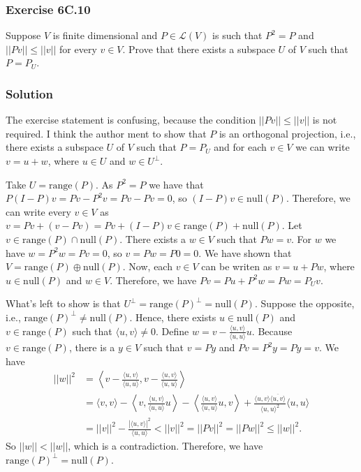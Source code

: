 \subsubsection*{Exercise 6C.10}

Suppose $V$ is finite dimensional and $P \in \mathcal{L}(V)$ is such that $P^2 = P$ and $||Pv|| \leq ||v||$ for every $v \in V$.
Prove that there exists a subspace $U$ of $V$ such that $P = P_U$.

\subsubsection*{Solution}

The exercise statement is confusing, because the condition $||Pv|| \leq ||v||$ is not required.
I think the author ment to show that $P$ is an orthogonal projection, i.e., there exists a subspace $U$ of $V$ such that $P = P_U$ and for each $v \in V$ we can write $v = u + w$, where $u \in U$ and $w \in U^{\perp}$.

Take $U = \mathrm{range}(P)$.
As $P^2 = P$ we have that $P(I-P)v = Pv - P^2v = Pv - Pv = 0$, so $(I - P)v \in \mathrm{null}(P)$.
Therefore, we can write every $v \in V$ as $v = Pv + (v - Pv) = Pv + (I - P)v \in \mathrm{range}(P) + \mathrm{null}(P)$.
Let $v \in \mathrm{range}(P) \cap \mathrm{null}(P)$.
There exists a $w \in V$ such that $Pw = v$.
For $w$ we have $w = P^2 w = Pv = 0$, so $v = Pw = P0 = 0$.
We have shown that $V = \mathrm{range}(P) \oplus \mathrm{null}(P)$.
Now, each $v \in V$ can be writen as $v = u + Pw$, where $u \in \mathrm{null}(P)$ and $w \in V$.
Therefore, we have $Pv = Pu + P^2w = Pw = P_{U}v$.

What's left to show is that $U^{\perp} = \mathrm{range}(P)^{\perp} = \mathrm{null}(P)$.
Suppose the opposite, i.e., $\mathrm{range}(P)^{\perp} \neq \mathrm{null}(P)$.
Hence, there exists $u \in \mathrm{null}(P)$ and $v \in \mathrm{range}(P)$ such that $\langle u, v \rangle \neq 0$.
Define $w = v - \frac{\langle u, v \rangle}{\langle u, u \rangle} u$.
Because $v \in \mathrm{range}(P)$, there is a $y \in V$ such that $v = Py$ and $Pv = P^2y = Py = v$.
We have
\begin{equation*}
    \begin{split}
        ||w||^2 &= \left\langle
                v - \frac{\langle u, v \rangle}{\langle u, u \rangle},
                v - \frac{\langle u, v \rangle}{\langle u, u \rangle}
            \right\rangle \\
            &= \langle v, v \rangle
                - \left\langle v, \frac{\langle u, v \rangle}{\langle u, u \rangle} u \right\rangle
                - \left\langle \frac{\langle u, v \rangle}{\langle u, u \rangle} u, v \right\rangle
                + \frac{\langle u, v \rangle \overline{\langle u, v \rangle}}{\langle u, u \rangle^2} \langle u, u \rangle \\
            &= ||v||^2 - \frac{|\langle u, v \rangle|^2}{\langle u, u \rangle} < ||v||^2 = ||Pv||^2 = ||Pw||^2 \leq ||w||^2.
    \end{split}
\end{equation*}
So $||w|| < ||w||$, which is a contradiction.
Therefore, we have $\mathrm{range}(P)^{\perp} = \mathrm{null}(P)$.
